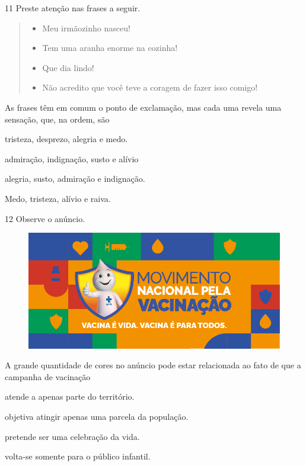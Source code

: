 \num{11} Preste atenção nas frases a seguir.

\begin{quote}
\begin{itemize}
\item Meu irmãozinho nasceu!

\item Tem uma aranha enorme na cozinha!

\item Que dia lindo!

\item Não acredito que você teve a coragem de fazer isso comigo!
\end{itemize}
\end{quote}

As frases têm em comum o ponto de exclamação, mas cada uma revela uma
sensação, que, na ordem, são

\begin{escolha}
\item tristeza, desprezo, alegria e medo.

\item admiração, indignação, susto e alívio

\item alegria, susto, admiração e indignação.

\item Medo, tristeza, alívio e raiva.
\end{escolha}

\pagebreak
\num{12} Observe o anúncio.

\begin{figure}[htpb!]
\includegraphics[width=\textwidth]{./media/simulados/image3.png}
\end{figure}

A grande quantidade de cores no anúncio pode estar relacionada ao fato
de que a campanha de vacinação

\begin{escolha}
\item atende a apenas parte do território.

\item objetiva atingir apenas uma parcela da população.

\item pretende ser uma celebração da vida.

\item volta-se somente para o público infantil.
\end{escolha}



